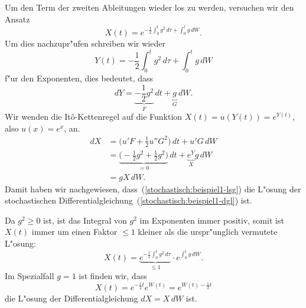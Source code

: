 Um den Term der zweiten Ableitungen wieder los zu werden, versuchen wir
den Ansatz
\begin{equation}
X(t) = e^{-\frac12\int_0^tg^2\,d\tau+\int_0^t g\,dW}.
\label{stochastisch:beispiel1-lsg}
\end{equation}
Um dies nachzupr"ufen schreiben wir wieder 
\[
Y(t)
=
-\frac12\int_0^tg^2\,d\tau+\int_0^t g\,dW
\]
f"ur den Exponenten, dies bedeutet, dass
\[
dY=\underbrace{-\frac12g^2}_{\textstyle F}\,dt + \underbrace{g}_{\textstyle G}\,dW.
\]
Wir wenden die It\^o-Kettenregel auf die Funktion
$X(t)=u(Y(t))=e^{Y(t)}$, also $u(x)=e^x$, an.
\begin{align*}
dX
&=
\biggl( u'F + \frac12u''G^2\biggr)\,dt + u'G\,dW
\\
&=
\underbrace{\biggl(-\frac12 g^2 + \frac12 g^2\biggr)}_{\textstyle=0}\,dt
+
\underbrace{e^Y}_{\textstyle X}g\,dW
\\
&=gX\,dW.
\end{align*}
Damit haben wir nachgewiesen, dass~(\ref{stochastisch:beispiel1-lsg})
die L"osung der stochastischen
Differentialgleichung~(\ref{stochastisch:beispiel1-dgl}) ist.

Da $g^2\ge 0$ ist, ist das Integral von $g^2$ im Exponenten
immer positiv, somit ist $X(t)$ immer um einen Faktor $\le1$ 
kleiner als die urspr"unglich vermutete L"osung:
\[
X(t)
=
\underbrace{e^{-\frac12 \int_0^tg^2\,d\tau}}_{\textstyle \le 1}\cdot e^{\int_0^tg\,dW}.
\]
Im Spezialfall $g=1$ ist finden wir, dass
\[
X(t)=e^{-\frac12t}e^{W(t)}=e^{W(t)-\frac12t}
\]
die L"osung der Differentialgleichung $dX=X\,dW$ ist.

